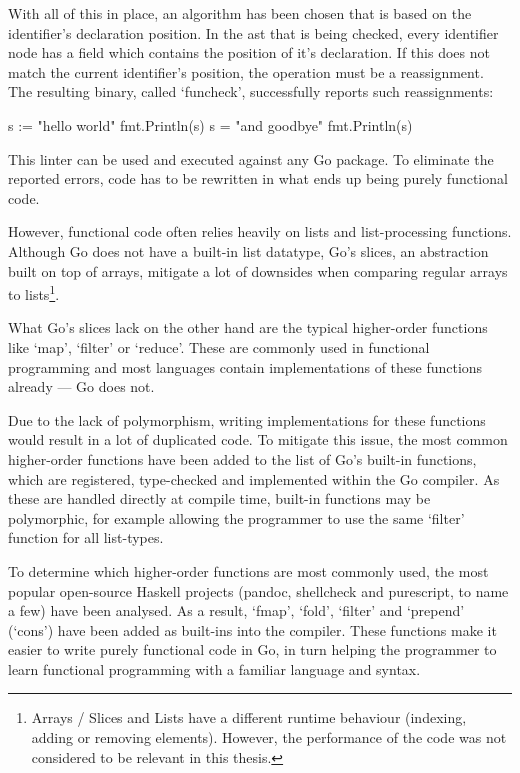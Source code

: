 With all of this in place, an algorithm has been chosen that is based on the identifier's
declaration position. In the \gls{ast} that is being checked, every identifier node has a field
which contains the position of it's declaration. If this does not match the current identifier's
position, the operation must be a reassignment.
The resulting binary, called `funcheck', successfully reports such reassignments:

\begin{gocode}
s := "hello world"
fmt.Println(s)
s = "and goodbye"
fmt.Println(s)
\end{gocode}


This linter can be used and executed against any Go package. To eliminate the reported errors,
code has to be rewritten in what ends up being purely functional code.

However, functional code often relies heavily on lists and list-processing functions.
Although Go does not have a built-in list datatype, Go's slices, an abstraction built
on top of arrays,
mitigate a lot of downsides when comparing regular arrays to lists\footnote{Arrays / Slices
and Lists have a different runtime behaviour (indexing, adding or removing elements).
However, the performance of the code was not considered to be relevant in this thesis.}.

What Go's slices lack on the other hand are the typical higher-order functions like `map',
`filter' or `reduce'. These are commonly used in functional programming and most languages
contain implementations of these functions already --- Go does not.

Due to the lack of polymorphism, writing implementations for these functions
would result in a lot of duplicated code. To mitigate this issue, the most
common higher-order functions have been added to the list of Go's built-in functions,
which are registered, type-checked and implemented within the Go compiler.
As these are handled directly at compile time, built-in functions may be polymorphic, for
example allowing the programmer to use the same `filter' function for all list-types.

To determine which higher-order functions are most commonly used, the most popular
open-source Haskell projects (pandoc, shellcheck and purescript, to name a few) have
been analysed. As a result, `fmap', `fold', `filter' and `prepend'
(`cons') have been added as built-ins into the compiler.
These functions make it easier to write purely functional code in Go, in turn helping
the programmer to learn functional programming with a familiar language and syntax.

